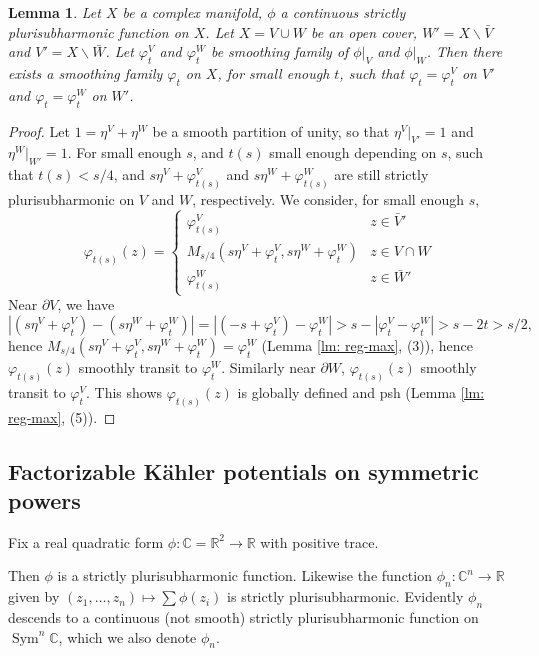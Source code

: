 \documentclass{article}
\def\R{\mathbb{R}}
\def\C{\mathbb{C}}
\def\d{\partial}
\def\RM{\backslash}
\DeclareMathOperator{\Sym}{Sym}
\def\bz{\mathbf{z}} %
\newtheorem{lemma}[theorem]{Lemma}
\theoremstyle{definition}
\begin{document}
\begin{lemma} \label{Varouchas lemma}
Let $X$ be a complex manifold, $\phi$ a  continuous strictly plurisubharmonic function on $X$. Let $X = V \cup W$ be an open cover, $W' = X \RM \bar V$ and $V' = X\RM \bar W$. Let $\varphi^V_t$ and $\varphi^W_t$ be smoothing family of $\phi|_V$ and $\phi|_W$. Then there exists a smoothing family $\varphi_t$ on $X$, for small enough $t$, such that $\varphi_t = \varphi^V_t$ on $V'$ and $\varphi_t = \varphi^W_t$ on $W'$. 
\end{lemma}
\begin{proof} 
Let $1 = \eta^V + \eta^W$ be a smooth partition of unity, so that $\eta^V|_{V'}=1$ and $\eta^W|_{W'}=1$. 
For small enough $s$, and $t(s)$ small enough depending on $s$, such that  $t(s) < s/4$, and
$s \eta^V + \varphi^V_{t(s)}$ and $s \eta^W + \varphi^W_{t(s)}$ are still strictly plurisubharmonic on $V$ and $W$, respectively. We consider, for small enough $s$, 
$$ \varphi_{t(s)}(z)= \begin{cases}
    \varphi^V_{t(s)} & z \in \bar V' \\
    M_{s/4}(s \eta^V + \varphi^V_t, s \eta^W + \varphi^W_t)  & z \in V \cap W \\
    \varphi^W_{t(s)} & z \in \bar W' 
\end{cases}
$$
Near $\d V$, we have 
$$ |  (s \eta^V + \varphi^V_t) - (s \eta^W + \varphi^W_t) | = |(-s  + \varphi^V_t) - \varphi^W_t| > s - |\varphi^V_t - \varphi^W_t| > s - 2t > s/2, $$
hence $M_{s/4}(s \eta^V + \varphi^V_t, s \eta^W + \varphi^W_t) = \varphi^W_t$ (Lemma \ref{lm: reg-max}, (3)), hence $\varphi_{t(s)}(z)$ smoothly transit to $\varphi^W_t$. Similarly near $\d W$, $\varphi_{t(s)}(z)$ smoothly transit to $\varphi^V_t$. This shows $\varphi_{t(s)}(z)$ is globally defined and psh (Lemma \ref{lm: reg-max}, (5)). 
\end{proof}






\subsection{Factorizable K\"ahler potentials on symmetric powers}
\def\bz{\mathbf{z}}



Fix a real quadratic form $\phi: \C = \R^2 \to \R$ with positive trace.   

Then $\phi$ is a strictly plurisubharmonic function.  Likewise the function $\phi_n: \C^n \to \R$ given by $(z_1, \ldots, z_n) \mapsto \sum \phi(z_i)$ is strictly plurisubharmonic. 
Evidently $\phi_n$ descends to a continuous (not smooth) strictly plurisubharmonic function on $\Sym^n \C$, which we also denote $\phi_n$.   
\end{document}
